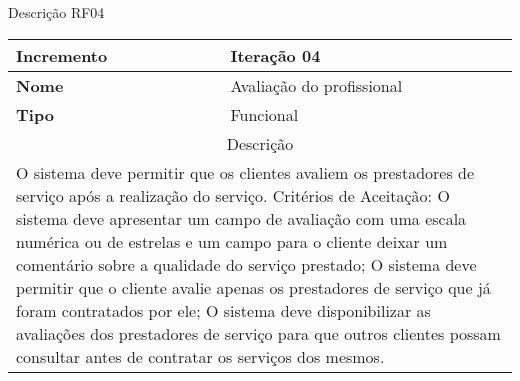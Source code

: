 \begin{quadro}[htb]
	\centering
	\caption{\label{Formatação do texto.}Descrição RF04}	
	\begin{tabular}{|l|p{11cm}|}
		\hline
		\textbf{Incremento}    & Iteração 04\\ \hline
		\textbf{Nome}    & Avaliação do profissional\\ \hline
		\textbf{Tipo}    & Funcional\\ \hline
		\multicolumn{2}{|c|}{Descrição}\\ \hline
		\multicolumn{2}{|p{12cm}|}{
			O sistema deve permitir que os clientes avaliem os prestadores de serviço após a realização do serviço. \newline
			\newline Critérios de Aceitação: \newline
			O sistema deve apresentar um campo de avaliação com uma escala numérica ou de estrelas e um campo para o cliente deixar um comentário sobre a qualidade do serviço prestado; \newline
			\newline O sistema deve permitir que o cliente avalie apenas os prestadores de serviço que já foram contratados por ele; \newline
			\newline O sistema deve disponibilizar as avaliações dos prestadores de serviço para que outros clientes possam consultar antes de contratar os serviços dos mesmos.
			} \\ \hline
	\end{tabular}
\end{quadro}

